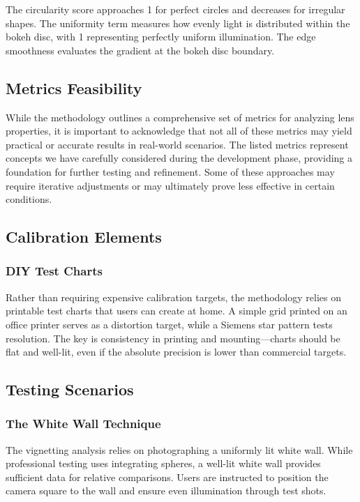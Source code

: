 The circularity score approaches 1 for perfect circles and decreases for irregular shapes. The uniformity term measures how evenly light is distributed within the bokeh disc, with 1 representing perfectly uniform illumination. The edge smoothness evaluates the gradient at the bokeh disc boundary.

\subsection{Metrics Feasibility}
While the methodology outlines a comprehensive set of metrics for analyzing lens properties, it is important to acknowledge that not all of these metrics may yield practical or accurate results in real-world scenarios. The listed metrics represent concepts we have carefully considered during the development phase, providing a foundation for further testing and refinement. Some of these approaches may require iterative adjustments or may ultimately prove less effective in certain conditions.

\subsection{Calibration Elements}
\subsubsection{DIY Test Charts}
Rather than requiring expensive calibration targets, the methodology relies on printable test charts that users can create at home. A simple grid printed on an office printer serves as a distortion target, while a Siemens star pattern tests resolution. The key is consistency in printing and mounting---charts should be flat and well-lit, even if the absolute precision is lower than commercial targets.

\subsection{Testing Scenarios}
\subsubsection{The White Wall Technique}
The vignetting analysis relies on photographing a uniformly lit white wall. While professional testing uses integrating spheres, a well-lit white wall provides sufficient data for relative comparisons. Users are instructed to position the camera square to the wall and ensure even illumination through test shots.

